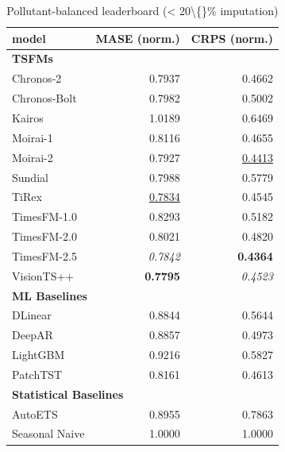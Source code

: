 \begin{table}[H]
\caption{Pollutant-balanced leaderboard (\textless{} 20\textbackslash\{\}\% imputation)}
\centering
\begin{small}
\begin{tabular}{lrr}
\toprule
model & MASE (norm.) & CRPS (norm.) \\
\midrule
\multicolumn{3}{l}{\textbf{TSFMs}} \\
Chronos-2 & 0.7937 & 0.4662 \\
Chronos-Bolt & 0.7982 & 0.5002 \\
Kairos & 1.0189 & 0.6469 \\
Moirai-1 & 0.8116 & 0.4655 \\
Moirai-2 & 0.7927 & \underline{0.4413} \\
Sundial & 0.7988 & 0.5779 \\
TiRex & \underline{0.7834} & 0.4545 \\
TimesFM-1.0 & 0.8293 & 0.5182 \\
TimesFM-2.0 & 0.8021 & 0.4820 \\
TimesFM-2.5 & \textit{0.7842} & \textbf{0.4364} \\
VisionTS++ & \textbf{0.7795} & \textit{0.4523} \\
\midrule
\multicolumn{3}{l}{\textbf{ML Baselines}} \\
DLinear & 0.8844 & 0.5644 \\
DeepAR & 0.8857 & 0.4973 \\
LightGBM & 0.9216 & 0.5827 \\
PatchTST & 0.8161 & 0.4613 \\
\midrule
\multicolumn{3}{l}{\textbf{Statistical Baselines}} \\
AutoETS & 0.8955 & 0.7863 \\
Seasonal Naive & 1.0000 & 1.0000 \\
\bottomrule
\end{tabular}
\end{small}
\end{table}